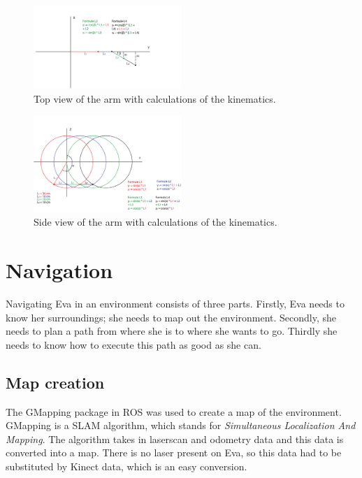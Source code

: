 \documentclass[project_eva.tex]{subfiles}
\begin{document}
\begin{figure}[h]
	\centering
	\mbox{\includegraphics[width=0.5\textwidth]{Images/2d_bovenaanzicht.png}}
	\caption{Top view of the arm with calculations of the kinematics.}
	\label{fig:IK1}
\end{figure}

\begin{figure}[h!]
	\centering
	\mbox{\includegraphics[width=0.5\textwidth]{Images/2d_zijaanzicht.png}}
	\caption{Side view of the arm with calculations of the kinematics.}
	\label{fig:IK2}
\end{figure}

\section*{Navigation}
Navigating Eva in an environment consists of three parts. Firstly, Eva needs to know her surroundings; she needs to map out the environment. Secondly, she needs to plan a path from where she is to where she wants to go. Thirdly she needs to know how to execute this path as good as she can.

\subsection*{Map creation}
The GMapping package in ROS was used to create a map of the environment. GMapping \cite{GMapping} is a SLAM algorithm, which stands for \textit{Simultaneous Localization And Mapping}. The algorithm takes in laserscan and odometry data and this data is converted into a map. There is no laser present on Eva, so this data had to be substituted by Kinect data, which is an easy conversion.
\end{document}
